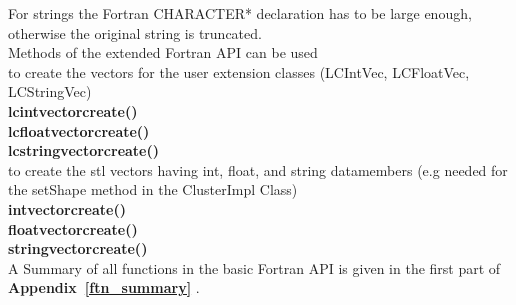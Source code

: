 For strings the Fortran CHARACTER* declaration has to be large enough, otherwise the original
string is truncated.\\

Methods of the extended Fortran API can be used\\

to create the vectors for the user extension classes (LCIntVec, LCFloatVec, LCStringVec)\\
 {\bf lcintvectorcreate()} \\
 {\bf lcfloatvectorcreate()} \\
 {\bf lcstringvectorcreate()} \\

to create the stl vectors having int, float, and string datamembers
(e.g needed for the setShape method in the ClusterImpl Class)\\
 {\bf intvectorcreate()} \\
 {\bf floatvectorcreate()} \\
 {\bf stringvectorcreate()} \\

A Summary of all functions in the basic Fortran API is given in the first part of {\bf Appendix~\ref{ftn_summary} }.


